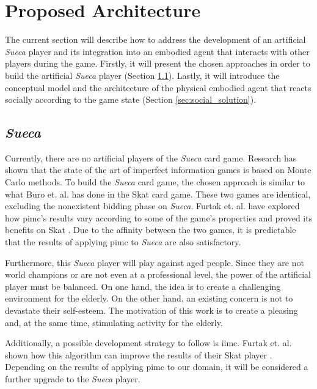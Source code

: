\section{Proposed Architecture} \label{sec:architecture}

The current section will describe how to address the development of an artificial \emph{Sueca} player and its integration into an embodied agent that interacts with other players during the game.
Firstly, it will present the chosen approaches in order to build the artificial \emph{Sueca} player (Section \ref{sec:sueca_solution}).
Lastly, it will introduce the conceptual model and the architecture of the physical embodied agent that reacts socially according to the game state (Section \ref{sec:social_solution}).


\subsection{\emph{Sueca}}
\label{sec:sueca_solution}

Currently, there are no artificial players of the \emph{Sueca} card game.
Research has shown that the state of the art of imperfect information games is based on Monte Carlo methods.
To build the \emph{Sueca} card game, the chosen approach is similar to what Buro et. al. has done in the Skat card game.
These two games are identical, excluding the nonexistent bidding phase on \emph{Sueca}.
Furtak et. al. have explored how \gls{pimc}'s results vary according to some of the game's properties and proved its benefits on Skat \cite{Long2010}.
Due to the affinity between the two games, it is predictable that the results of applying \gls{pimc} to \emph{Sueca} are also satisfactory.

Furthermore, this \emph{Sueca} player will play against aged people.
Since they are not world champions or are not even at a professional level, the power of the artificial player must be balanced.
On one hand, the idea is to create a challenging environment for the elderly.
On the other hand, an existing concern is not to devastate their self-esteem.
The motivation of this work is to create a pleasing and, at the same time, stimulating activity for the elderly.

Additionally, a possible development strategy to follow is \gls{iimc}.
Furtak et. al. shown how this algorithm can improve the results of their Skat player \cite{Furtak}.
Depending on the results of applying \gls{pimc} to our domain, it will be considered a further upgrade to the \emph{Sueca} player.

